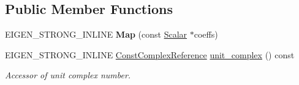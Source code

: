 \subsection*{Public Member Functions}
\begin{DoxyCompactItemize}
\item 
E\+I\+G\+E\+N\+\_\+\+S\+T\+R\+O\+N\+G\+\_\+\+I\+N\+L\+I\+NE {\bfseries Map} (const \hyperlink{class_eigen_1_1_map_3_01const_01_sophus_1_1_s_o2_group_3_01___scalar_01_4_00_01___options_01_4_a437464266d5d506a72bca93371ba33f1}{Scalar} $\ast$coeffs)\hypertarget{class_eigen_1_1_map_3_01const_01_sophus_1_1_s_o2_group_3_01___scalar_01_4_00_01___options_01_4_aa42e4d99217223b3ac603c0bc2e45ca1}{}\label{class_eigen_1_1_map_3_01const_01_sophus_1_1_s_o2_group_3_01___scalar_01_4_00_01___options_01_4_aa42e4d99217223b3ac603c0bc2e45ca1}

\item 
E\+I\+G\+E\+N\+\_\+\+S\+T\+R\+O\+N\+G\+\_\+\+I\+N\+L\+I\+NE \hyperlink{class_eigen_1_1_map_3_01const_01_sophus_1_1_s_o2_group_3_01___scalar_01_4_00_01___options_01_4_ae8150799b694d2530765a9f8be6a3429}{Const\+Complex\+Reference} \hyperlink{class_eigen_1_1_map_3_01const_01_sophus_1_1_s_o2_group_3_01___scalar_01_4_00_01___options_01_4_a7ba2acb9c4e8dc4df2f7eaf6ec07e5c0}{unit\+\_\+complex} () const 
\begin{DoxyCompactList}\small\item\em Accessor of unit complex number. \end{DoxyCompactList}\end{DoxyCompactItemize}
